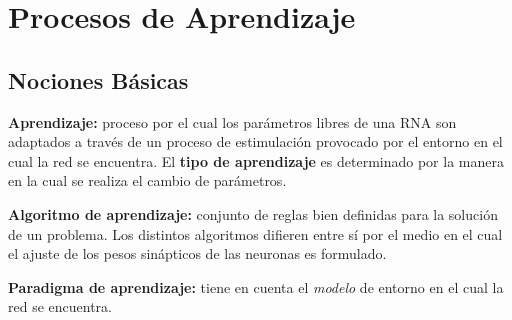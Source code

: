 \documentclass[10pt,a4paper]{article}
\begin{document}
\section{Procesos de Aprendizaje}

\subsection{Nociones Básicas}

\begin{description}
\item \textbf{Aprendizaje:} proceso por el cual los parámetros libres de una RNA son adaptados a través de un proceso de estimulación provocado por el entorno en el cual la red se encuentra. El \textbf{tipo de aprendizaje} es determinado por la manera en la cual se realiza el cambio de parámetros.
\item \textbf{Algoritmo de aprendizaje:} conjunto de reglas bien definidas para la solución de un problema. Los distintos algoritmos difieren entre sí por el medio en el cual el ajuste de los pesos sinápticos de las neuronas es formulado.
\item \textbf{Paradigma de aprendizaje:} tiene en cuenta el \textit{modelo} de entorno en el cual la red se encuentra.
\end{description}
\end{document}
